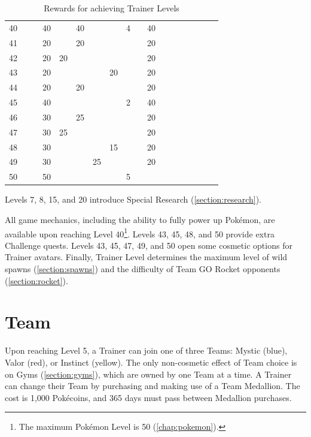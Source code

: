 \begin{table}[t]
\begin{center}
\begin{tabular}{r|g c g c g c g c g c g c g c g c g}
   40 &    &    & 40 &    & 40 &    &    & 4 &    & 40 &    &    &    &   &   &   & \\
   41 &    &    & 20 &    & 20 &    &    &   &    & 20 &    &    &    &   &   &   & \\
   42 &    &    & 20 & 20 &    &    &    &   &    & 20 &    &    &    &   &   &   & \\
   43 &    &    & 20 &    &    &    & 20 &   &    & 20 &    &    &    &   &   &   & \\
   44 &    &    & 20 &    & 20 &    &    &   &    & 20 &    &    &    &   &   &   & \\
   45 &    &    & 40 &    &    &    &    & 2 &    & 40 &    &    &    &   &   &   & \\
   46 &    &    & 30 &    & 25 &    &    &   &    & 20 &    &    &    &   &   &   & \\
   47 &    &    & 30 & 25 &    &    &    &   &    & 20 &    &    &    &   &   &   & \\
   48 &    &    & 30 &    &    &    & 15 &   &    & 20 &    &    &    &   &   &   & \\
   49 &    &    & 30 &    &    & 25 &    &   &    & 20 &    &    &    &   &   &   & \\
   50 &    &    & 50 &    &    &    &    & 5 &    &    &    &    &    &   &   &   & \\
\end{tabular}
\caption{Rewards for achieving Trainer Levels}
\label{table:levelitems}
\end{center}
\end{table}
Levels 7, 8, 15, and 20 introduce Special Research (\autoref{section:research}).

All game mechanics, including the ability to fully power up Pokémon,
 are available upon reaching Level 40\footnote{The maximum Pokémon Level is 50 (\autoref{chap:pokemon}).}.
Levels 43, 45, 48, and 50 provide extra Challenge quests.
Levels 43, 45, 47, 49, and 50 open some cosmetic options for Trainer avatars.
Finally, Trainer Level determines the maximum level of wild spawns
  (\autoref{section:spawns}) and the difficulty of Team GO Rocket
  opponents (\autoref{section:rocket}).

\section{Team}
Upon reaching Level 5, a Trainer can join one of three Teams: Mystic (blue),
  Valor (red), or Instinct (yellow).
The only non-cosmetic effect of Team choice is on Gyms (\autoref{section:gyms}), which
  are owned by one Team at a time.
A Trainer can change their Team by purchasing and making use of a Team Medallion.
The cost is 1,000 Pokécoins, and 365 days must pass between Medallion purchases.

